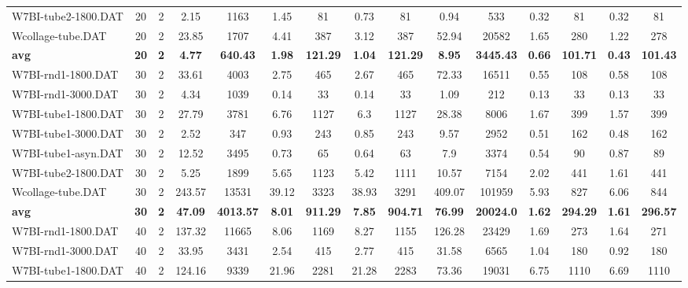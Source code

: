 \begin{table}[!ht]
{\begin{tabular}{lcccccccccccccc}
W7BI-tube2-1800.DAT & 20 & 2 & 2.15 & 1163 & 1.45 & 81 & 0.73 & 81 & 0.94 & 533 &  \textcolor{blue2}{0.32} & 81 &  \textcolor{blue2}{0.32} & 81 \\
Wcollage-tube.DAT & 20 & 2 & 23.85 & 1707 & 4.41 & 387 & 3.12 & 387 & 52.94 & 20582 & 1.65 & 280 &  \textcolor{blue2}{1.22} & 278 \\
\cline{1-15} \textbf{avg} & \textbf{20} & \textbf{2} & \textbf{4.77} & \textbf{640.43} & \textbf{1.98} & \textbf{121.29} & \textbf{1.04} & \textbf{121.29} & \textbf{8.95} & \textbf{3445.43} & \textbf{0.66} & \textbf{101.71} & \textbf{0.43} & \textbf{101.43} \\ \cline{1-15}
W7BI-rnd1-1800.DAT & 30 & 2 & 33.61 & 4003 & 2.75 & 465 & 2.67 & 465 & 72.33 & 16511 &  \textcolor{blue2}{0.55} & 108 & 0.58 & 108 \\
W7BI-rnd1-3000.DAT & 30 & 2 & 4.34 & 1039 & 0.14 & 33 & 0.14 & 33 & 1.09 & 212 &  \textcolor{blue2}{0.13} & 33 &  \textcolor{blue2}{0.13} & 33 \\
W7BI-tube1-1800.DAT & 30 & 2 & 27.79 & 3781 & 6.76 & 1127 & 6.3 & 1127 & 28.38 & 8006 & 1.67 & 399 &  \textcolor{blue2}{1.57} & 399 \\
W7BI-tube1-3000.DAT & 30 & 2 & 2.52 & 347 & 0.93 & 243 & 0.85 & 243 & 9.57 & 2952 & 0.51 & 162 &  \textcolor{blue2}{0.48} & 162 \\
W7BI-tube1-asyn.DAT & 30 & 2 & 12.52 & 3495 & 0.73 & 65 & 0.64 & 63 & 7.9 & 3374 &  \textcolor{blue2}{0.54} & 90 & 0.87 & 89 \\
W7BI-tube2-1800.DAT & 30 & 2 & 5.25 & 1899 & 5.65 & 1123 & 5.42 & 1111 & 10.57 & 7154 & 2.02 & 441 &  \textcolor{blue2}{1.61} & 441 \\
Wcollage-tube.DAT & 30 & 2 & 243.57 & 13531 & 39.12 & 3323 & 38.93 & 3291 & 409.07 & 101959 &  \textcolor{blue2}{5.93} & 827 & 6.06 & 844 \\
\cline{1-15} \textbf{avg} & \textbf{30} & \textbf{2} & \textbf{47.09} & \textbf{4013.57} & \textbf{8.01} & \textbf{911.29} & \textbf{7.85} & \textbf{904.71} & \textbf{76.99} & \textbf{20024.0} & \textbf{1.62} & \textbf{294.29} & \textbf{1.61} & \textbf{296.57} \\ \cline{1-15}
W7BI-rnd1-1800.DAT & 40 & 2 & 137.32 & 11665 & 8.06 & 1169 & 8.27 & 1155 & 126.28 & 23429 & 1.69 & 273 &  \textcolor{blue2}{1.64} & 271 \\
W7BI-rnd1-3000.DAT & 40 & 2 & 33.95 & 3431 & 2.54 & 415 & 2.77 & 415 & 31.58 & 6565 & 1.04 & 180 &  \textcolor{blue2}{0.92} & 180 \\
W7BI-tube1-1800.DAT & 40 & 2 & 124.16 & 9339 & 21.96 & 2281 & 21.28 & 2283 & 73.36 & 19031 & 6.75 & 1110 &  \textcolor{blue2}{6.69} & 1110 \\

\end{tabular}}
\end{table}
